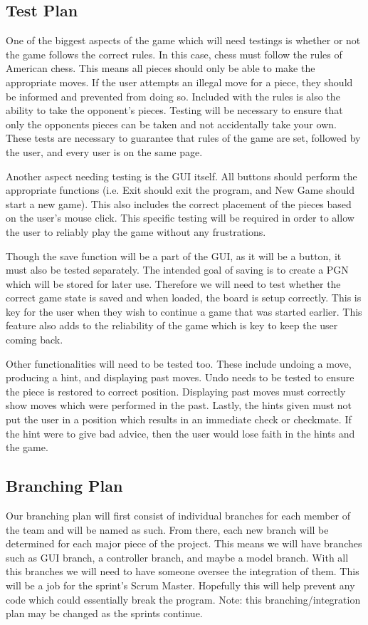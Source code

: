 \documentclass{article}
\begin{document}
	\subsection*{Test Plan}
	One of the biggest aspects of the game which will need testings is whether or not the game follows the correct rules. In this case, chess must follow the rules of American chess. This means all pieces should only be able to make the appropriate moves. If the user attempts an illegal move for a piece, they should be informed and prevented from doing so. Included with the rules is also the ability to take the opponent's pieces. Testing will be necessary to ensure that only the opponents pieces can be taken and not accidentally take your own. These tests are necessary to guarantee that rules of the game are set, followed by the user, and every user is on the same page. \par
	Another aspect needing testing is the GUI itself. All buttons should perform the appropriate functions (i.e. Exit should exit the program, and New Game should start a new game). This also includes the correct placement of the pieces based on the user's mouse click. This specific testing will be required in order to allow the user to reliably play the game without any frustrations. \par
	Though the save function will be a part of the GUI, as it will be a button, it must also be tested separately. The intended goal of saving is to create a PGN which will be stored for later use. Therefore we will need to test whether the correct game state is saved and when loaded, the board is setup correctly. This is key for the user when they wish to continue a game that was started earlier. This feature also adds to the reliability of the game which is key to keep the user coming back. \par
	Other functionalities will need to be tested too. These include undoing a move, producing a hint, and displaying past moves. Undo needs to be tested to ensure the piece is restored to correct position. Displaying past moves must correctly show moves which were performed in the past. Lastly, the hints given must not put the user in a position which results in an immediate check or checkmate. If the hint were to give bad advice, then the user would lose faith in the hints and the game. \par
	\subsection*{Branching Plan}
	\par
	Our branching plan will first consist of individual branches for each member of the team and will be named as such. From there, each new branch will be determined for each major piece of the project. This means we will have branches such as GUI branch, a controller branch, and maybe a model branch. With all this branches we will need to have someone oversee the integration of them. This will be a job for the sprint's Scrum Master. Hopefully this will help prevent any code which could essentially break the program. Note: this branching/integration plan may be changed as the sprints continue.
	\newpage
	
\end{document}
